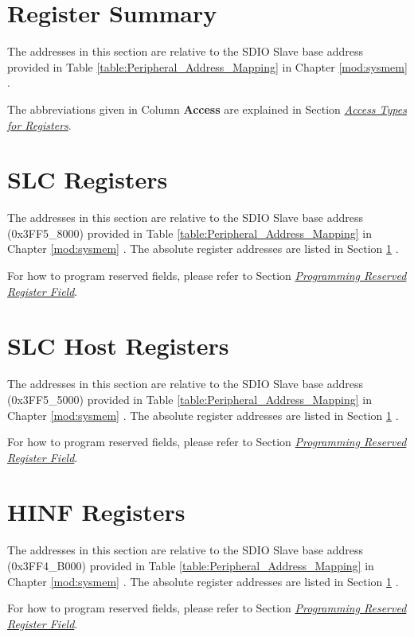 \documentclass[main\_\_EN.tex]{subfiles}
\begin{document}
\hypertarget{sdioslave-reg-summ}{}
\section{Register Summary}\label{sec:sdioslave-reg-summ}

The addresses in this section are relative to the SDIO Slave base address provided in Table \ref{table:Peripheral_Address_Mapping} in Chapter \ref{mod:sysmem} \textit{}.

The abbreviations given in Column \textbf{Access} are explained in Section \hyperref[glossary-access-types]{\textit{Access Types for Registers}}.



\clearpage
\section{SLC Registers}

The addresses in this section are relative to the SDIO Slave base address (0x3FF5\_8000) provided in Table \ref{table:Peripheral_Address_Mapping} in Chapter \ref{mod:sysmem} \textit{}. The absolute register addresses are listed in Section \ref{sec:sdioslave-reg-summ} \textit{}. 

For how to program reserved fields, please refer to Section \hyperref[programming-reserved-field]{\textit{Programming Reserved Register Field}}.



\section{SLC Host Registers}

The addresses in this section are relative to the SDIO Slave base address (0x3FF5\_5000) provided in Table \ref{table:Peripheral_Address_Mapping} in Chapter \ref{mod:sysmem} \textit{}. The absolute register addresses are listed in Section \ref{sec:sdioslave-reg-summ} \textit{}. 

For how to program reserved fields, please refer to Section \hyperref[programming-reserved-field]{\textit{Programming Reserved Register Field}}.



\section{HINF Registers}

The addresses in this section are relative to the SDIO Slave base address (0x3FF4\_B000) provided in Table \ref{table:Peripheral_Address_Mapping} in Chapter \ref{mod:sysmem} \textit{}. The absolute register addresses are listed in Section \ref{sec:sdioslave-reg-summ} \textit{}. 

For how to program reserved fields, please refer to Section \hyperref[programming-reserved-field]{\textit{Programming Reserved Register Field}}.


\end{document}
